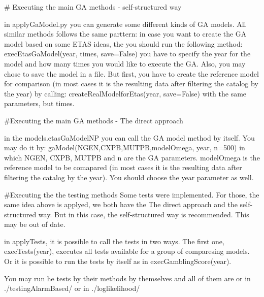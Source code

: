 \# Executing the main GA methods -\/ self-\/structured way 
\begin{DoxyCode}
in applyGaModel.py you can generate some different kinds of GA models.
All similar methods follows the same parttern: 
  in case you want to create the GA model based on some ETAS ideas,
  the you should run the following method:
    execEtasGaModel(year, times, save=False)
  you have to specify the year for the model and how many times you
  would like to execute the GA. Also, you may chose to save the model
  in a file. But first, you have to create the reference model for
  comparison (in most cases it is the resulting data after filtering
  the catalog by the year) by calling:
    createRealModelforEtas(year, save=False)
  with the same parameters, but times.
\end{DoxyCode}


\#\+Executing the main GA methods -\/ The direct approach 
\begin{DoxyCode}
in the models.etasGaModelNP you can call the GA model method by itself.
You may do it by:
  gaModel(NGEN,CXPB,MUTPB,modelOmega, year, n=500)
in which NGEN, CXPB, MUTPB and n are the GA parameters. modelOmega
is the reference model to be comapared (in most cases it is the
resulting data after filtering the catalog by the year). You should
choose the year parameter as well.
\end{DoxyCode}


\#\+Executing the the testing methods Some tests were implemented. For those, the same idea above is applyed, we both have the The direct approach and the self-\/structured way. But in this case, the self-\/structured way is recommended. This may be out of date.


\begin{DoxyCode}
in applyTests, it is possible to call the tests in two ways. The first
one, execTests(year), executes all tests available for a group of
comparesing models. Or it is possible to run the tests by itself as in
execGamblingScore(year).
\end{DoxyCode}


You may run he tests by their methods by themselves and all of them are or in ./testing\+Alarm\+Based/ or in ./loglikelihood/ 